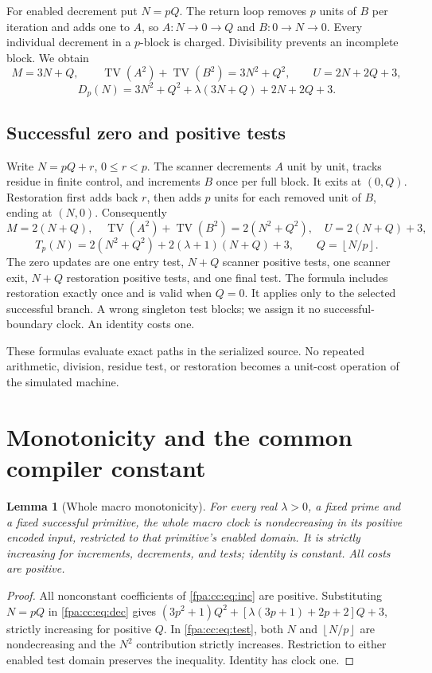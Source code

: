\documentclass[11pt,a4paper]{article}
\numberwithin{equation}{section}
\newtheorem{lemma}[theorem]{Lemma}
\newcommand{\floor}[1]{\left\lfloor #1\right\rfloor}
\newcommand{\TV}{\operatorname{TV}}
\newcommand{\lam}{\lambda}
\begin{document}
For enabled decrement put $N=pQ$. The return loop removes $p$ units of $B$
per iteration and adds one to $A$, so $A:N\to0\to Q$ and $B:0\to N\to0$.
Every individual decrement in a $p$-block is charged. Divisibility prevents
an incomplete block. We obtain
\[
 M=3N+Q,\qquad \TV(A^2)+\TV(B^2)=3N^2+Q^2,\qquad U=2N+2Q+3,
\]
\begin{equation}
 D_p(N)=3N^2+Q^2+\lam(3N+Q)+2N+2Q+3.
 \label{fpa:cc:eq:dec}
\end{equation}

\subsection{Successful zero and positive tests}
Write $N=pQ+r$, $0\leq r<p$. The scanner decrements $A$ unit by unit,
tracks residue in finite control, and increments $B$ once per full block.
It exits at $(0,Q)$. Restoration first adds back $r$, then adds $p$ units
for each removed unit of $B$, ending at $(N,0)$. Consequently
\[
 M=2(N+Q),\quad \TV(A^2)+\TV(B^2)=2(N^2+Q^2),\quad U=2(N+Q)+3,
\]
\begin{equation}
 T_p(N)=2(N^2+Q^2)+2(\lam+1)(N+Q)+3,
 \qquad Q=\floor{N/p}.
 \label{fpa:cc:eq:test}
\end{equation}
The zero updates are one entry test, $N+Q$ scanner positive tests, one
scanner exit, $N+Q$ restoration positive tests, and one final test. The
formula includes restoration exactly once and is valid when $Q=0$.
It applies only to the selected successful branch. A wrong singleton test
blocks; we assign it no successful-boundary clock. An identity costs one.

These formulas evaluate exact paths in the serialized source. No repeated
arithmetic, division, residue test, or restoration becomes a unit-cost
operation of the simulated machine.
\newpage

\section{Monotonicity and the common compiler constant}
\label{fpa:cc:sec:invariance}
\begin{lemma}[Whole macro monotonicity]
\label{fpa:cc:lem:monotone}
For every real $\lam>0$, a fixed prime and a fixed successful primitive,
the whole macro clock is nondecreasing in its positive encoded input,
restricted to that primitive's enabled domain. It is strictly increasing
for increments, decrements, and tests; identity is constant. All costs are
positive.
\end{lemma}
\begin{proof}
All nonconstant coefficients of \eqref{fpa:cc:eq:inc} are positive. Substituting
$N=pQ$ in \eqref{fpa:cc:eq:dec} gives
$(3p^2+1)Q^2+[\lam(3p+1)+2p+2]Q+3$, strictly increasing for positive $Q$.
In \eqref{fpa:cc:eq:test}, both $N$ and $\floor{N/p}$ are nondecreasing and the
$N^2$ contribution strictly increases. Restriction to either enabled test
domain preserves the inequality. Identity has clock one.
\end{proof}
\end{document}
